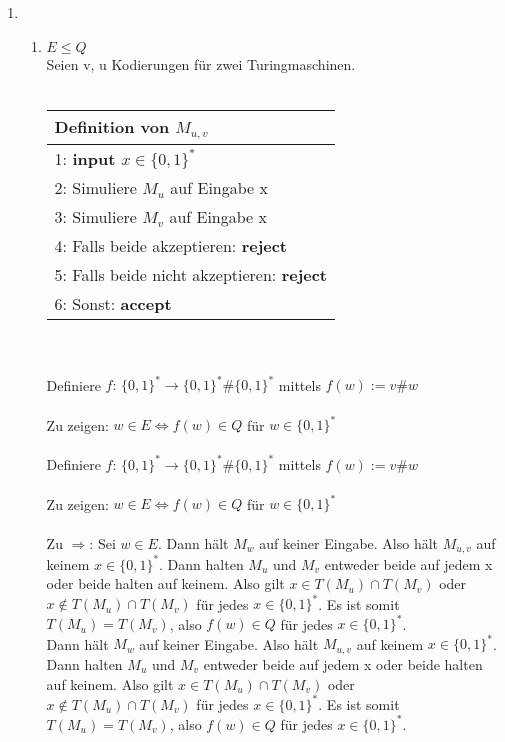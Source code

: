 \documentclass[12pt]{scrartcl}
\begin{document}
\exercise{}
\begin{enumerate}
    \item \begin{enumerate}
        \item $E \leq Q$\\
              Seien v, u Kodierungen für zwei Turingmaschinen. \\\\
              \begin{tabular}[h!]{l}
                \hline
                Definition von $M_{u, v}$\\\hline
                1: \textbf{input $x \in \{0,1\}^*$}\\
                2: Simuliere $M_u$ auf Eingabe x\\
                3: Simuliere $M_v$ auf Eingabe x\\
                4: Falls beide akzeptieren: \textbf{reject}\\
                5: Falls beide nicht akzeptieren: \textbf{reject}\\
                6: Sonst: \textbf{accept}\\\hline
              \end{tabular}\\\\
              Definiere $f: \, \{0,1\}^* \rightarrow \{0,1\}^* \# \{0,1\}^*$ mittels $f(w) := v\#w$\\\\
              Zu zeigen: $w \in E \Longleftrightarrow f(w) \in Q $ für $w \in \{0,1\}^*$\\\\
              Definiere $f: \, \{0,1\}^* \rightarrow \{0,1\}^* \# \{0,1\}^*$ mittels $f(w) := v\#w$\\\\
              Zu zeigen: $w \in E \Longleftrightarrow f(w) \in Q $ für $w \in \{0,1\}^*$\\\\
              Zu $\Rightarrow$: Sei $w \in E$. Dann hält $M_w$ auf keiner Eingabe. Also hält 
              $M_{u,v}$ auf keinem $x \in \{0,1\}^*$. Dann halten $M_u$ und $M_v$ entweder beide auf jedem x oder beide halten auf keinem.
               Also gilt $x \in T(M_u) \cap T(M_v)$ oder $x \notin T(M_u) \cap T(M_v)$ für jedes $x \in \{0,1\}^*$. Es ist somit
               $ T(M_u) = T(M_v)$, also $f(w) \in Q$ für jedes $x \in \{0,1\}^*$.\\
 Dann hält $M_w$ auf keiner Eingabe. Also hält 
              $M_{u,v}$ auf keinem $x \in \{0,1\}^*$. Dann halten $M_u$ und $M_v$ entweder beide auf jedem x oder beide halten auf keinem.
               Also gilt $x \in T(M_u) \cap T(M_v)$ oder $x \notin T(M_u) \cap T(M_v)$ für jedes $x \in \{0,1\}^*$. Es ist somit
               $ T(M_u) = T(M_v)$, also $f(w) \in Q$ für jedes $x \in \{0,1\}^*$.\\


\end{enumerate}
\end{enumerate}
\end{document}
